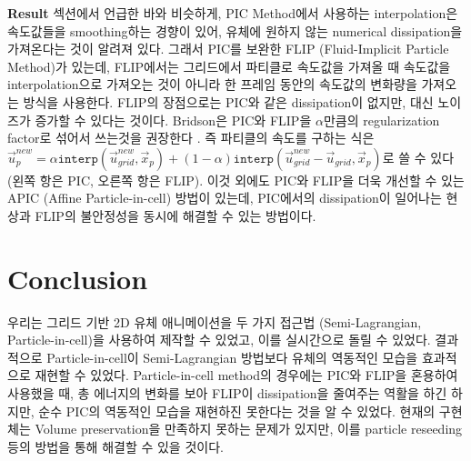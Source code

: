 \documentclass[11pt, A4]{article}
\begin{document}
\textbf{Result} 섹션에서 언급한 바와 비슷하게, PIC Method에서 사용하는 interpolation은 속도값들을 smoothing하는 경향이 있어, 유체에 원하지 않는 numerical dissipation을 가져온다는 것이 알려져 있다. 그래서 PIC를 보완한 FLIP (Fluid-Implicit Particle Method)가 있는데, FLIP에서는 그리드에서 파티클로 속도값을 가져올 때 속도값을 interpolation으로 가져오는 것이 아니라 한 프레임 동안의 속도값의 변화량을 가져오는 방식을 사용한다. FLIP의 장점으로는 PIC와 같은 dissipation이 없지만, 대신 노이즈가 증가할 수 있다는 것이다. Bridson은 PIC와 FLIP을 $\alpha$만큼의 regularization factor로 섞어서 쓰는것을 권장한다 \cite[p. 118]{fluid-sim-cg}. 즉 파티클의 속도를 구하는 식은 $\vec{u}_p^{new} = \alpha \texttt{interp}(\vec{u}_{grid}^{new}, \vec{x}_p) + (1 - \alpha) \texttt{interp}(\vec{u}_{grid}^{new} - \vec{u}_{grid}, \vec{x}_p)$로 쓸 수 있다 (왼쪽 항은 PIC, 오른쪽 항은 FLIP). 이것 외에도 PIC와 FLIP을 더욱 개선할 수 있는 APIC (Affine Particle-in-cell) 방법이 있는데, PIC에서의 dissipation이 일어나는 현상과 FLIP의 불안정성을 동시에 해결할 수 있는 방법이다. \cite{apic}

\section{Conclusion}

우리는 그리드 기반 2D 유체 애니메이션을 두 가지 접근법 (Semi-Lagrangian, Particle-in-cell)을 사용하여 제작할 수 있었고, 이를 실시간으로 돌릴 수 있었다. 결과적으로 Particle-in-cell이 Semi-Lagrangian 방법보다 유체의 역동적인 모습을 효과적으로 재현할 수 있었다. Particle-in-cell method의 경우에는 PIC와 FLIP을 혼용하여 사용했을 때, 총 에너지의 변화를 보아 FLIP이 dissipation을 줄여주는 역활을 하긴 하지만, 순수 PIC의 역동적인 모습을 재현하진 못한다는 것을 알 수 있었다. 현재의 구현체는 Volume preservation을 만족하지 못하는 문제가 있지만, 이를 particle reseeding 등의 방법을 통해 해결할 수 있을 것이다.
\end{document}
